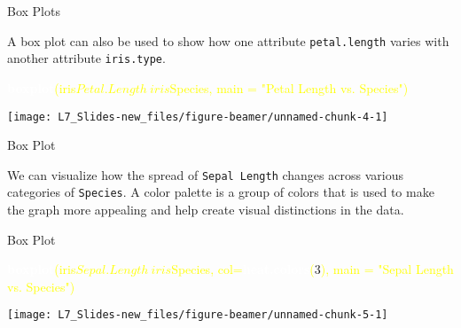 \documentclass[ignorenonframetext,]{beamer}
\newenvironment{Shaded}{\begin{snugshade}}{\end{snugshade}}
\newcommand{\KeywordTok}[1]{\textcolor{white}{\textbf{{#1}}}}
\newcommand{\NormalTok}[1]{\textcolor{yellow}{{#1}}}
\newcommand{\DataTypeTok}[1]{\textcolor{yellow}{{#1}}}
\newcommand{\DecValTok}[1]{\textcolor{numbercolor}{{#1}}}
\newcommand{\StringTok}[1]{\textcolor{yellow}{{#1}}}
\begin{document}
\begin{frame}[fragile]{Box Plots}

A box plot can also be used to show how one attribute
\texttt{petal.length} varies with another attribute \texttt{iris.type}.

\small

\begin{Shaded}
\begin{Highlighting}[]
\KeywordTok{boxplot}\NormalTok{(iris$Petal.Length~iris$Species, }
        \DataTypeTok{main =} \StringTok{"Petal Length vs. Species"}\NormalTok{) }
\end{Highlighting}
\end{Shaded}

\begin{center}\texttt{[image: L7\_Slides-new\_files/figure-beamer/unnamed-chunk-4-1]} \end{center}

\end{frame}

\begin{frame}[fragile]{Box Plot}

We can visualize how the spread of \texttt{Sepal\ Length} changes across
various categories of \texttt{Species}. A color palette is a group of
colors that is used to make the graph more appealing and help create
visual distinctions in the data.

\end{frame}

\begin{frame}[fragile]{Box Plot}

\small

\begin{Shaded}
\begin{Highlighting}[]
\KeywordTok{boxplot}\NormalTok{(iris$Sepal.Length~iris$Species,}
        \DataTypeTok{col=}\KeywordTok{heat.colors}\NormalTok{(}\DecValTok{3}\NormalTok{), }
        \DataTypeTok{main =} \StringTok{"Sepal Length vs. Species"}\NormalTok{)}
\end{Highlighting}
\end{Shaded}

\begin{center}\texttt{[image: L7\_Slides-new\_files/figure-beamer/unnamed-chunk-5-1]} \end{center}

\end{frame}
\end{document}
